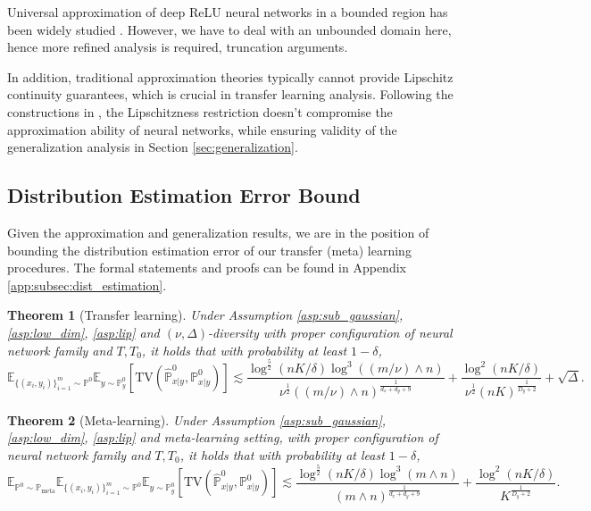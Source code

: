 \documentclass{article}
\numberwithin{equation}{section}
\newcommand{\E}{\mathbb{E}}
\newtheorem{thm}{Theorem}[section]
\theoremstyle{definition}
\newcommand{\Pmeta}{\mathbb{P}_{\text{meta}}}
\renewcommand{\P}{\mathbb{P}}
\begin{document}
Universal approximation of deep ReLU neural networks in a bounded region has been widely studied \citep{yarotsky2017error,schmidt2020nonparametric}.
However, we have to deal with an unbounded domain here, hence more refined analysis is required,  truncation arguments. 

In addition, traditional approximation theories typically cannot provide Lipschitz continuity guarantees, which is crucial in transfer learning analysis.
Following the constructions in \citet{chen2023score}, the Lipschitzness restriction doesn't compromise the approximation ability of neural networks, while ensuring validity of the generalization analysis in Section \ref{sec:generalization}.

\subsection{Distribution Estimation Error Bound}

Given the approximation and generalization results, we are in the position of bounding the distribution estimation error of our transfer (meta) learning procedures.
The formal statements and proofs can be found in Appendix \ref{app:subsec:dist_estimation}.

\begin{thm}[Transfer learning]
\label{thm:distribution_diversity_informal}
    Under Assumption \ref{asp:sub_gaussian}, \ref{asp:low_dim}, \ref{asp:lip} and $(\nu,\Delta)$-diversity with proper configuration of neural network family and $T,T_0$, it holds that with probability at least $1-\delta$,
    \begin{equation}
        \E_{\{(x_i,y_i)\}_{i=1}^m\sim\P^0}\E_{y\sim\P^0_y} [\mathrm{TV}(\widehat{\P}^0_{x|y},\P^0_{x|y})]
        \lesssim \frac{\log^{\frac{5}{2}}(nK/\delta)\log^3((m/\nu)\wedge n)}{\nu^{\frac{1}{2}}((m/\nu)\wedge n)^{\frac{1}{d_x+d_y+9}}}+\frac{\log^2(nK/\delta)}{\nu^{\frac{1}{2}}(nK)^{\frac{1}{D_y+2}}}+\sqrt{\Delta}.
    \end{equation}
\end{thm}


\begin{thm}[Meta-learning]
\label{thm:distribution_informal}
    Under Assumption \ref{asp:sub_gaussian}, \ref{asp:low_dim}, \ref{asp:lip} and meta-learning setting, with proper configuration of neural network family and $T,T_0$, it holds that with probability at least $1-\delta$,
    \begin{equation}
        \E_{\P^0\sim\Pmeta}\E_{\{(x_i,y_i)\}_{i=1}^m\sim \P^0}\E_{y\sim\P^0_y} [\mathrm{TV}(\widehat{\P}^0_{x|y},\P_{x|y}^0)]
        \lesssim \frac{\log^{\frac{5}{2}}(nK/\delta)\log^3(m\wedge n)}{(m\wedge n)^{\frac{1}{d_x+d_y+9}}}+\frac{\log^2(nK/\delta)}{K^{\frac{1}{D_y+2}}}.
    \end{equation}
\end{thm}
\end{document}

